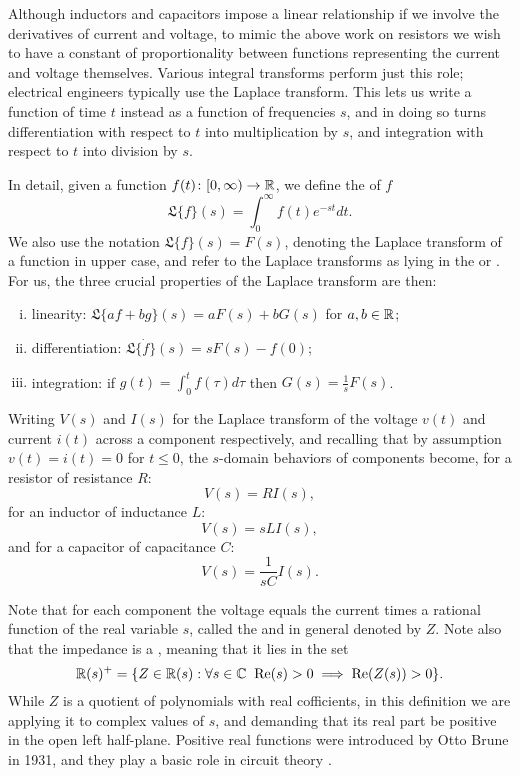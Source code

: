 Although inductors and capacitors impose a linear relationship if we involve the
derivatives of current and voltage, to mimic the above work on resistors we wish
to have a constant of proportionality between functions representing the current
and voltage themselves. Various integral transforms perform just this role; electrical
engineers typically use the Laplace transform. This lets us write a function of time $t$ instead as a function of frequencies $s$, and in doing so turns differentiation with respect to $t$ into multiplication by $s$, and integration with respect to $t$ into
division by $s$.  

In detail, given a function $f(t){\colon} [0, \infty) \to {\mathbb{R}}$, we define the
 of $f$
\[
  \mathfrak{L}\{f\}(s) = \int_{0}^\infty f(t) e^{-st} dt.
\]
We also use the notation $\mathfrak{L}\{f\}(s) = F(s)$, denoting the Laplace
transform of a function in upper case, and refer to the Laplace transforms as
lying in the  or . For us, the three
crucial properties of the Laplace transform are then: 
\begin{enumerate}[(i)]
  \item linearity: $\mathfrak{L}\{af+bg\}(s) = aF(s)+bG(s)$ for $a,b\in {\mathbb{R}}$;
  \item differentiation: $\mathfrak{L}\{\dot{f}\}(s) = s F(s) - f(0)$;
  \item integration: if $g(t) = \int_0^t f(\tau)d\tau$ then 
 $G(s) = \frac{1}{s} F(s)$.
\end{enumerate}
Writing $V(s)$ and $I(s)$ for the Laplace transform of the voltage $v(t)$ and
current $i(t)$ across a component respectively, and recalling that by assumption
$v(t) = i(t) = 0$ for $t \le 0$, the $s$-domain behaviors of components become,
for a resistor of resistance $R$:
\[
  V(s) = RI(s),
\]
for an inductor of inductance $L$:
\[
  V(s) = sLI(s),
\]
and for a capacitor of capacitance $C$:
\[
  V(s) = \frac1{sC} I(s). 
\]

Note that for each component the voltage equals the current times a rational function of
the real variable $s$, called the  and in general denoted by $Z$.
Note also that the impedance is a , meaning that it lies
in the set
\[         {\mathbb{R}}(s)^+ = \{ Z \in {\mathbb{R}}(s) : \forall s \in {\mathbb C} \;\; \mathrm{Re}(s) > 0 \implies 
\mathrm{Re}(Z(s)) > 0 \} . \]
While $Z$ is a quotient of polynomials with real cofficients, in this definition
we are applying it to complex values of $s$, and demanding that its real part be
positive in the open left half-plane.  Positive real functions were introduced by Otto 
Brune in 1931, and they play a basic role in circuit theory \cite{Brune}.  

